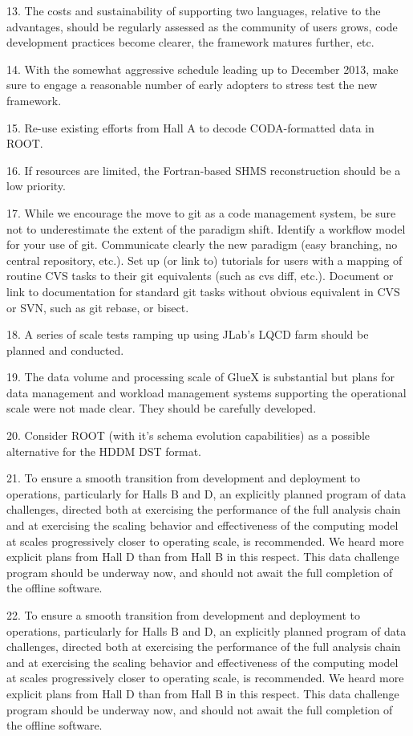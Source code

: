\documentclass[12pt]{article}
\begin{document}
13. The costs and sustainability of supporting two languages, relative to the advantages, should be regularly assessed as the community of users grows, code development practices become clearer, the framework matures further, etc.

14. With the somewhat aggressive schedule leading up to December 2013, make sure to engage a reasonable number of early adopters to stress test the new framework.

15. Re-use existing efforts from Hall A to decode CODA-formatted data in ROOT.

16. If resources are limited, the Fortran-based SHMS reconstruction should be a low priority.

17. While we encourage the move to git as a code management system, be sure not to underestimate the extent of the paradigm shift. Identify a workflow model for your use of git. Communicate clearly the new paradigm (easy branching, no central repository, etc.). Set up (or link to) tutorials for users with a mapping of routine CVS tasks to their git equivalents (such as cvs diff, etc.). Document or link to documentation for standard git tasks without obvious equivalent in CVS or SVN, such as git rebase, or bisect.

18. A series of scale tests ramping up using JLab’s LQCD farm should be planned and conducted.

19. The data volume and processing scale of GlueX is substantial but plans for data management and workload management systems supporting the operational scale were not made clear. They should be carefully developed.

20. Consider ROOT (with it’s schema evolution capabilities) as a possible alternative for the HDDM DST format.

21. To ensure a smooth transition from development and deployment to operations, particularly for Halls B and D, an explicitly planned program of data challenges, directed both at exercising the performance of the full analysis chain and at exercising the scaling behavior and effectiveness of the computing model at scales progressively closer to operating scale, is recommended. We heard more explicit plans from Hall D than from Hall B in this respect. This data challenge program should be underway now, and should not await the full completion of the offline software.

22. To ensure a smooth transition from development and deployment to operations, particularly for Halls B and D, an explicitly planned program of data challenges, directed both at exercising the performance of the full analysis chain and at exercising the scaling behavior and effectiveness of the computing model at scales progressively closer to operating scale, is recommended. We heard more explicit plans from Hall D than from Hall B in this respect. This data challenge program should be underway now, and should not await the full completion of the offline software. 
\end{document}
